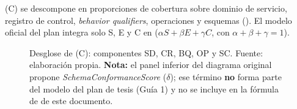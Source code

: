 
\CoverageScore{} (C) se descompone en proporciones de cobertura sobre dominio de servicio,
registro de control, \textit{behavior qualifiers}, operaciones y esquemas ().
El modelo oficial del plan integra solo S, E y C en \AlignmentScore{}
($\alpha S + \beta E + \gamma C$, con $\alpha + \beta + \gamma = 1$).

\begin{figure}[H]
  \centering
  \figApoyoC
  \caption{Desglose de \CoverageScore{} (C): componentes SD, CR, BQ, OP y SC. Fuente: elaboración
  propia. \textbf{Nota:} el panel inferior del diagrama original propone
  \textit{SchemaConformanceScore} ($\delta$); ese término \textbf{no} forma parte del modelo del
  plan de tesis (Guía 1) y no se incluye en la fórmula de \AlignmentScore{} de este documento.}
  \label{fig:proc-cobertura}
\end{figure}
